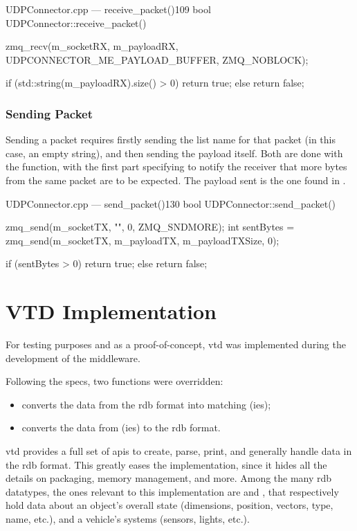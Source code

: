 \begin{codelist}{UDPConnector.cpp --- receive\_packet()}{109}
bool UDPConnector::receive_packet() {
	zmq_recv(m_socketRX, m_payloadRX, UDPCONNECTOR_ME_PAYLOAD_BUFFER, ZMQ_NOBLOCK);

	if (std::string(m_payloadRX).size() > 0)
		return true;
	else
		return false;
}
\end{codelist}

\subsubsection{Sending Packet}

Sending a \gls{packet} requires firstly sending the list name for that \gls{packet} (in this case, an empty string), and then sending the \gls{payload} itself. Both are done with the  function, with the first part specifying  to notify the receiver that more bytes from the same \gls{packet} are to be expected. The \gls{payload} sent is the one found in .

\begin{codelist}{UDPConnector.cpp --- send\_packet()}{130}
bool UDPConnector::send_packet() {
	zmq_send(m_socketTX, "", 0, ZMQ_SNDMORE);
	int sentBytes = zmq_send(m_socketTX, m_payloadTX, m_payloadTXSize, 0);

	if (sentBytes > 0)
		return true;
	else
		return false;
}
\end{codelist}

\section{VTD Implementation}\label{sc:middleware:implementation}

For testing purposes and as a proof-of-concept, \gls{vtd} was implemented during the development of the \gls{middleware}.

Following the specs, two functions were overridden:

\begin{itemize}
	\item {} converts the data from the \gls{rdb} format into matching (ies);
	\item {} converts the data from (ies) to the \gls{rdb} format.
\end{itemize}

\gls{vtd} provides a full set of \glspl{api} to create, parse, print, and generally handle data in the \gls{rdb} format. This greatly eases the implementation, since it hides all the details on packaging, memory management, and more. Among the many \gls{rdb} datatypes, the ones relevant to this implementation are  and , that respectively hold data about an object's overall state (dimensions, position, vectors, type, name, etc.), and a vehicle's systems (sensors, lights, etc.).

